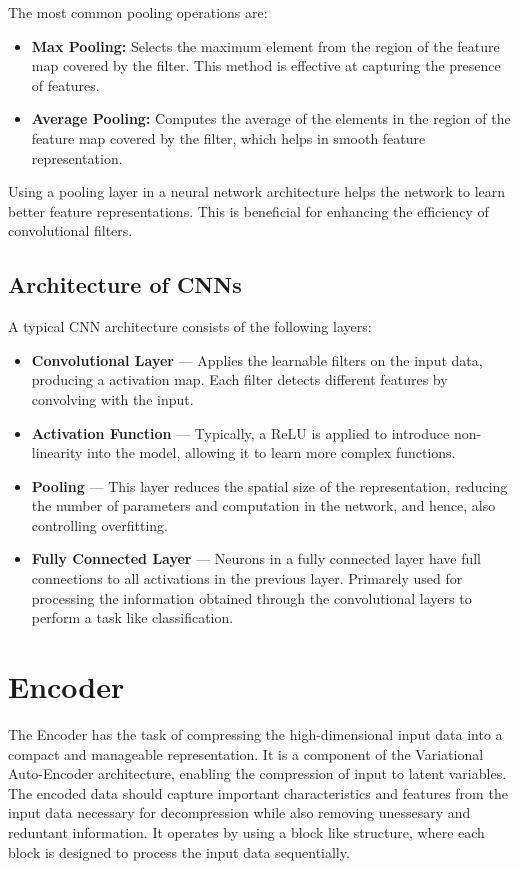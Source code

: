 The most common pooling operations are:
\begin{itemize}
    \item \textbf{Max Pooling:} Selects the maximum element from the region of the feature map covered by the filter. This method is effective at capturing the presence of features.
    \item \textbf{Average Pooling:} Computes the average of the elements in the region of the feature map covered by the filter, which helps in smooth feature representation.
\end{itemize}



Using a pooling layer in a neural network architecture helps the network to learn better feature representations. This is beneficial for enhancing the efficiency of convolutional filters.

\subsection{Architecture of CNNs}
A typical CNN architecture consists of the following layers:

\begin{itemize}
    \item \textbf{Convolutional Layer} — Applies the learnable filters on the input data, producing a activation map. Each filter detects different features by convolving with the input.
    \item \textbf{Activation Function} — Typically, a ReLU is applied to introduce non-linearity into the model, allowing it to learn more complex functions.
    \item \textbf{Pooling} — This layer reduces the spatial size of the representation, reducing the number of parameters and computation in the network, and hence, also controlling overfitting. 
    \item \textbf{Fully Connected Layer} — Neurons in a fully connected layer have full connections to all activations in the previous layer. Primarely used for processing the information obtained through the convolutional layers to perform a task like classification.
\end{itemize}

\section{Encoder}
The Encoder has the task of compressing the high-dimensional input data into a compact and manageable representation. It is a component of the Variational Auto-Encoder architecture, enabling the compression of input to latent variables.
The encoded data should capture important characteristics and features from the input data necessary for decompression while also removing unessesary and reduntant information. 
It operates by using a block like structure, where each block is designed to process the input data sequentially.

